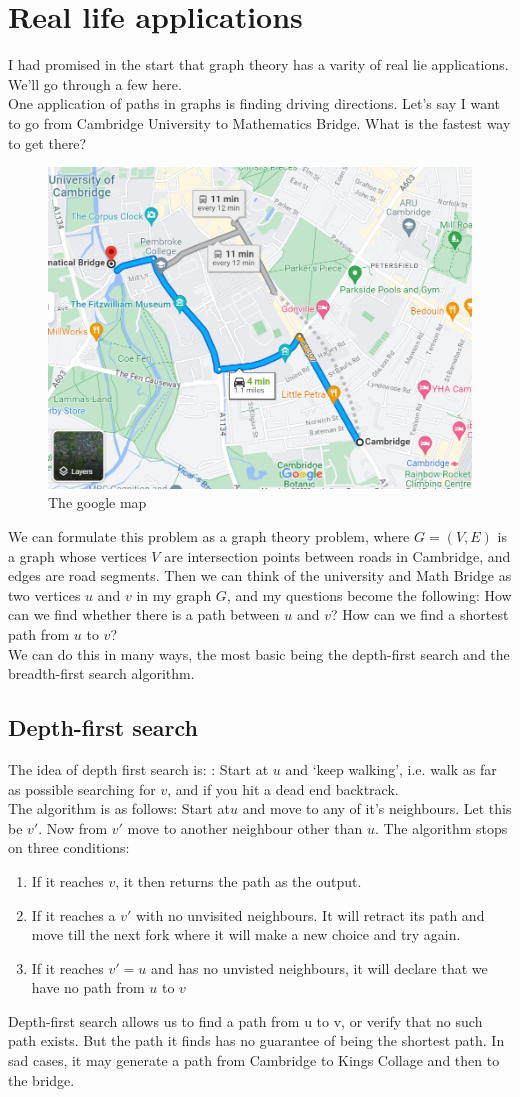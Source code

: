 \section{Real life applications}
I had promised in the start that graph theory has a varity of real lie applications. We'll go through a few here.\\
One application of paths in graphs is finding driving directions. Let's say I want to go from Cambridge University to Mathematics Bridge.  What is the fastest way to get there?
\begin{figure}[h]
    \centering
    \includegraphics[width=0.5\linewidth]{Photos/map.png}
    \caption{The google map}
\end{figure}
We can formulate this problem as a graph theory problem, where $G = (V, E)$ is a graph whose vertices $V$ are intersection points between roads in Cambridge, and edges are road segments. Then we can think of the university and Math Bridge as two vertices $u$ and $v$ in my graph $G$, and my questions become the following: How can we find whether there is a path between $u$ and $v$? How can we find a shortest path from $u$ to $v$?\\
We can do this in many ways, the most basic being the depth-first search and the breadth-first search algorithm.\\
\subsection{Depth-first search}
The idea of depth first search is: : Start at $u$ and ‘keep walking’, i.e. walk as far as possible searching for $v$, and if you hit a dead end backtrack.\\
The algorithm is as follows: Start at$u$ and move to any of it's neighbours. Let this be $v'$. Now from $v'$ move to another neighbour other than $u$. The algorithm stops on three conditions:\\
\begin{enumerate}
    \item If it reaches $v$, it then returns the path as the output.
    \item If it reaches a $v'$ with no unvisited neighbours. It will retract its path and move till the next fork where it will make a new choice and try again.
    \item If it reaches $v'=u$ and has no unvisted neighbours, it will declare that we have no path from $u$ to $v$
\end{enumerate}
Depth-first search allows us to find a path from u to v, or verify that no such path exists. But the path it finds has no guarantee of being the shortest path. In sad cases, it may generate a path from Cambridge to Kings Collage and then to the bridge.\\
